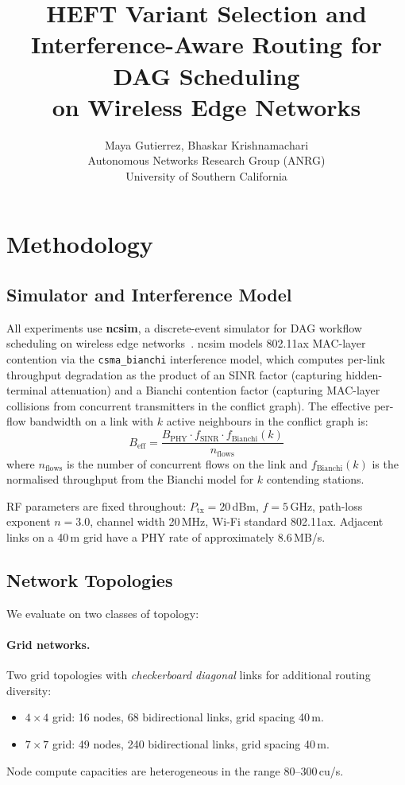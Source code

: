 \documentclass[11pt]{article}
\title{HEFT Variant Selection and Interference-Aware Routing for DAG Scheduling\\
on Wireless Edge Networks}
\author{%
  Maya Gutierrez, Bhaskar Krishnamachari\\
  Autonomous Networks Research Group (ANRG)\\
  University of Southern California
}
\begin{document}
\maketitle

\section{Methodology}
\label{sec:methodology}

\subsection{Simulator and Interference Model}

All experiments use \textbf{ncsim}, a discrete-event simulator for DAG workflow
scheduling on wireless edge networks~\cite{ncsim}.
ncsim models 802.11ax MAC-layer contention via the \texttt{csma\_bianchi}
interference model, which computes per-link throughput degradation as the product
of an SINR factor (capturing hidden-terminal attenuation) and a Bianchi contention
factor (capturing MAC-layer collisions from concurrent transmitters in the conflict
graph).  The effective per-flow bandwidth on a link with $k$ active neighbours
in the conflict graph is:
\[
  B_{\text{eff}} = \frac{B_{\text{PHY}} \cdot f_{\text{SINR}} \cdot f_{\text{Bianchi}}(k)}{n_{\text{flows}}}
\]
where $n_{\text{flows}}$ is the number of concurrent flows on the link and
$f_{\text{Bianchi}}(k)$ is the normalised throughput from the Bianchi model for
$k$ contending stations.

RF parameters are fixed throughout: $P_{\text{tx}} = 20$\,dBm, $f = 5$\,GHz,
path-loss exponent $n = 3.0$, channel width 20\,MHz, Wi-Fi standard 802.11ax.
Adjacent links on a 40\,m grid have a PHY rate of approximately 8.6\,MB/s.

\subsection{Network Topologies}

We evaluate on two classes of topology:

\paragraph{Grid networks.}
Two grid topologies with \emph{checkerboard diagonal} links for additional
routing diversity:
\begin{itemize}
  \item $4\times4$ grid: 16 nodes, 68 bidirectional links, grid spacing 40\,m.
  \item $7\times7$ grid: 49 nodes, 240 bidirectional links, grid spacing 40\,m.
\end{itemize}
Node compute capacities are heterogeneous in the range 80--300\,cu/s.
\end{document}
